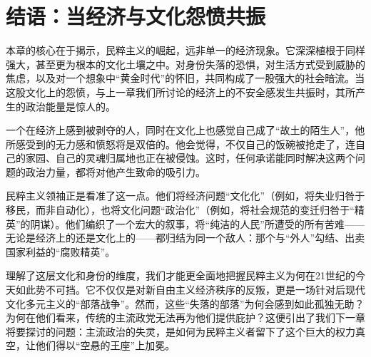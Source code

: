\section{结语：当经济与文化怨愤共振}

本章的核心在于揭示，民粹主义的崛起，远非单一的经济现象。它深深植根于同样强大，甚至更为根本的文化土壤之中。对身份失落的恐惧，对生活方式受到威胁的焦虑，以及对一个想象中“黄金时代”的怀旧，共同构成了一股强大的社会暗流。当这股文化上的怨愤，与上一章我们所讨论的经济上的不安全感发生共振时，其所产生的政治能量是惊人的。

一个在经济上感到被剥夺的人，同时在文化上也感觉自己成了“故土的陌生人”，他所感受到的无力感和愤怒将是双倍的。他会觉得，不仅自己的饭碗被抢走了，连自己的家园、自己的灵魂归属地也正在被侵蚀。这时，任何承诺能同时解决这两个问题的政治力量，都将对他产生致命的吸引力。

民粹主义领袖正是看准了这一点。他们将经济问题“文化化”（例如，将失业归咎于移民，而非自动化），也将文化问题“政治化”（例如，将社会规范的变迁归咎于“精英”的阴谋）。他们编织了一个宏大的叙事，将“纯洁的人民”所遭受的所有苦难——无论是经济上的还是文化上的——都归结为同一个敌人：那个与“外人”勾结、出卖国家利益的“腐败精英”。

理解了这层文化和身份的维度，我们才能更全面地把握民粹主义为何在21世纪的今天如此势不可挡。它不仅仅是对新自由主义经济秩序的反叛，更是一场针对后现代文化多元主义的“部落战争”。然而，这些“失落的部落”为何会感到如此孤独无助？为何在他们看来，传统的主流政党无法再为他们提供庇护？这便引出了我们下一章将要探讨的问题：主流政治的失灵，是如何为民粹主义者留下了这个巨大的权力真空，让他们得以“空悬的王座”上加冕。